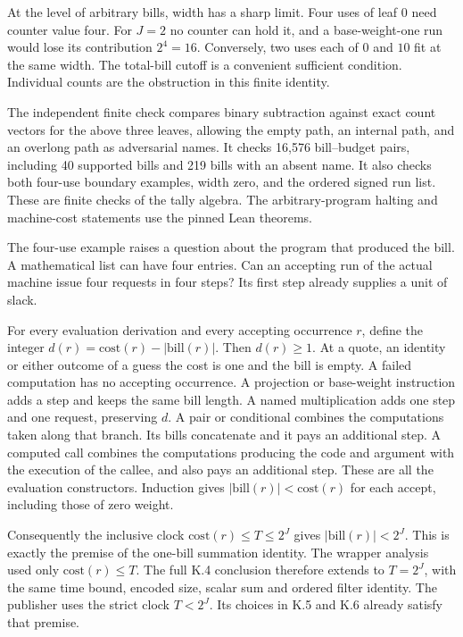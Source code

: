 At the level of arbitrary bills, width has a sharp limit. Four uses of leaf $0$ need counter
value four. For $J=2$ no counter can hold it, and a base-weight-one run
would lose its contribution $2^4=16$. Conversely, two uses each of
$0$ and $10$ fit at the same width. The total-bill cutoff is a convenient
sufficient condition. Individual counts are the obstruction in this
finite identity.

The independent finite check compares binary subtraction against exact
count vectors for the above three leaves, allowing the empty path, an
internal path, and an overlong path as adversarial names. It checks
16,576 bill--budget pairs, including 40 supported bills and 219 bills
with an absent name. It also checks both four-use boundary examples,
width zero, and the ordered signed run list. These are finite checks of
the tally algebra. The arbitrary-program halting and machine-cost
statements use the pinned Lean theorems.

\clearpage
{}\label{sec:15endpoint}
The four-use example raises a question about the program that produced the bill. A mathematical list can have four entries. Can an accepting run of the actual machine issue four requests in four steps? Its first step already supplies a unit of slack.

For every evaluation derivation and every accepting occurrence $r$, define the integer $d(r)=\mathrm{cost}(r)-|\mathrm{bill}(r)|$. Then $d(r)\ge1$. At a quote, an identity or either outcome of a guess the cost is one and the bill is empty. A failed computation has no accepting occurrence. A projection or base-weight instruction adds a step and keeps the same bill length. A named multiplication adds one step and one request, preserving $d$. A pair or conditional combines the computations taken along that branch. Its bills concatenate and it pays an additional step. A computed call combines the computations producing the code and argument with the execution of the callee, and also pays an additional step. These are all the evaluation constructors. Induction gives $|\mathrm{bill}(r)|<\mathrm{cost}(r)$ for each accept, including those of zero weight.

Consequently the inclusive clock $\mathrm{cost}(r)\le T\le 2^J$ gives $|\mathrm{bill}(r)|<2^J$. This is exactly the premise of the one-bill summation identity. The wrapper analysis used only $\mathrm{cost}(r)\le T$. The full K.4 conclusion therefore extends to $T=2^J$, with the same time bound, encoded size, scalar sum and ordered filter identity. The publisher uses the strict clock $T<2^J$. Its choices in K.5 and K.6 already satisfy that premise.

